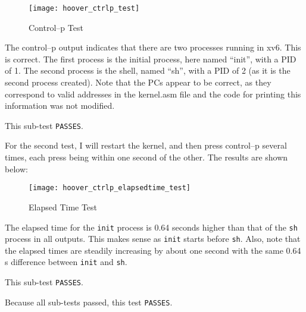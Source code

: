 \documentclass[11pt,letterpaper]{report}
\begin{document}
\begin{figure}[h]
	\centering
	\texttt{[image: hoover\_ctrlp\_test]}
	\caption[ctl-p test]{Control--p Test}
	\label{fig:hooverctrlptest}
\end{figure}
	
	 The control--p output indicates that there are two processes running in xv6. This is correct. The first process is the initial process, here named ``init'', with a PID of 1. The second process is the shell, named ``sh'', with a PID of 2 (as it is the second process created). Note that the PCs appear to be correct, as they correspond to valid addresses in the kernel.asm file and the code for printing this information was not modified. 
	
	This sub-test {\tt PASSES}. 

\newpage
	For the second test, I will restart the kernel, and then press control--p several times, each press being within one second of the other. The results are shown below:

\begin{figure}[h!]
	\centering
	\texttt{[image: hoover\_ctrlp\_elapsedtime\_test]}
	\caption[elapsed time]{Elapsed Time Test}
	\label{fig:hooverctrlpelapsedtimetest}
\end{figure}
	
	The elapsed time for the  {\tt init} process is 0.64 seconds higher than that of the {\tt sh} process in all outputs. This makes sense as {\tt init} starts before {\tt sh}. Also, note that the elapsed times are steadily increasing by about one second with the same 0.64 s difference between {\tt init} and {\tt sh}. 
	
	This sub-test {\tt PASSES}.
	
	Because all sub-tests passed, this test {\tt PASSES}. \\
\end{document}
